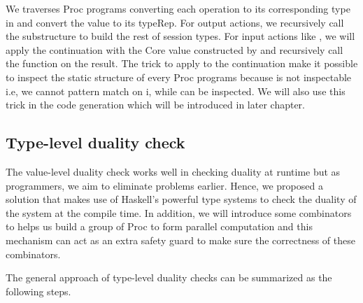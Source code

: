 We traverses Proc programs converting each operation to its corresponding type in  and convert the value to its typeRep. For output actions, we recursively call the substructure to build the rest of session types. For input actions like , we will apply the continuation with the Core value constructed by and recursively call the function on the result. The trick to apply  to the continuation make it possible to inspect the static structure of every Proc programs because  is not inspectable i.e, we cannot pattern match on i, while  can be inspected. We will also use this trick in the code generation which will be introduced in later chapter.
\subsection{Type-level duality check} %
The value-level duality check works well in checking duality at runtime but as programmers, we aim to eliminate problems earlier. Hence, we proposed a solution that makes use of Haskell's powerful type systems to check the duality of the system at the compile time. In addition, we will introduce some combinators to helps us build a group of Proc to form parallel computation and this mechanism can act as an extra safety guard to make sure the correctness of these combinators.

The general approach of type-level duality checks can be summarized as the following steps.

